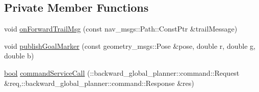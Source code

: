 \subsection*{Private Member Functions}
\begin{DoxyCompactItemize}
\item 
void \hyperlink{classmove__base__z__client_1_1backward__global__planner_1_1BackwardGlobalPlanner_a21ba5e6dbe063eb3ea1a34d8cccf90a3}{on\+Forward\+Trail\+Msg} (const nav\+\_\+msgs\+::\+Path\+::\+Const\+Ptr \&trail\+Message)
\item 
void \hyperlink{classmove__base__z__client_1_1backward__global__planner_1_1BackwardGlobalPlanner_adefb1127aa2a4f9c487763aea3817864}{publish\+Goal\+Marker} (const geometry\+\_\+msgs\+::\+Pose \&pose, double r, double g, double b)
\item 
\hyperlink{classbool}{bool} \hyperlink{classmove__base__z__client_1_1backward__global__planner_1_1BackwardGlobalPlanner_ad6f5fb1f85f6869b06bd4cb0feada148}{command\+Service\+Call} (\+::backward\+\_\+global\+\_\+planner\+::command\+::\+Request \&req,\+::backward\+\_\+global\+\_\+planner\+::command\+::\+Response \&res)
\end{DoxyCompactItemize}

